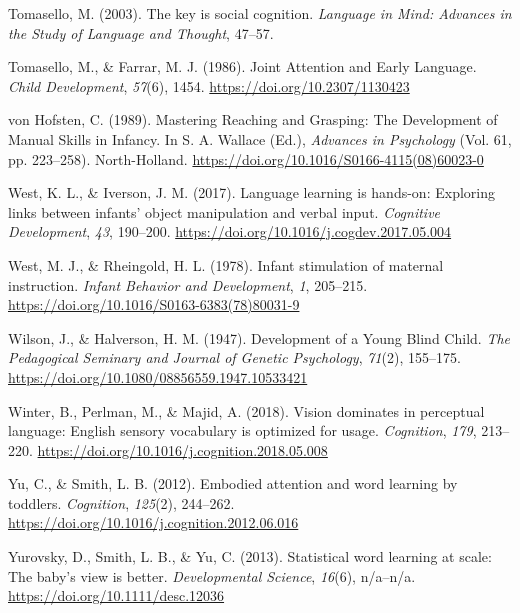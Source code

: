 \documentclass[english,man,floatsintext]{apa6}
\begin{document}
\leavevmode\hypertarget{ref-tomasello2003}{}%
Tomasello, M. (2003). The key is social cognition. \emph{Language in Mind: Advances in the Study of Language and Thought}, 47--57.

\leavevmode\hypertarget{ref-tomasello1986}{}%
Tomasello, M., \& Farrar, M. J. (1986). Joint Attention and Early Language. \emph{Child Development}, \emph{57}(6), 1454. \url{https://doi.org/10.2307/1130423}

\leavevmode\hypertarget{ref-vonhofsten1989}{}%
von Hofsten, C. (1989). Mastering Reaching and Grasping: The Development of Manual Skills in Infancy. In S. A. Wallace (Ed.), \emph{Advances in Psychology} (Vol. 61, pp. 223--258). North-Holland. \url{https://doi.org/10.1016/S0166-4115(08)60023-0}

\leavevmode\hypertarget{ref-west2017}{}%
West, K. L., \& Iverson, J. M. (2017). Language learning is hands-on: Exploring links between infants' object manipulation and verbal input. \emph{Cognitive Development}, \emph{43}, 190--200. \url{https://doi.org/10.1016/j.cogdev.2017.05.004}

\leavevmode\hypertarget{ref-west1978}{}%
West, M. J., \& Rheingold, H. L. (1978). Infant stimulation of maternal instruction. \emph{Infant Behavior and Development}, \emph{1}, 205--215. \url{https://doi.org/10.1016/S0163-6383(78)80031-9}

\leavevmode\hypertarget{ref-wilson1947}{}%
Wilson, J., \& Halverson, H. M. (1947). Development of a Young Blind Child. \emph{The Pedagogical Seminary and Journal of Genetic Psychology}, \emph{71}(2), 155--175. \url{https://doi.org/10.1080/08856559.1947.10533421}

\leavevmode\hypertarget{ref-winter2018}{}%
Winter, B., Perlman, M., \& Majid, A. (2018). Vision dominates in perceptual language: English sensory vocabulary is optimized for usage. \emph{Cognition}, \emph{179}, 213--220. \url{https://doi.org/10.1016/j.cognition.2018.05.008}

\leavevmode\hypertarget{ref-yu2012}{}%
Yu, C., \& Smith, L. B. (2012). Embodied attention and word learning by toddlers. \emph{Cognition}, \emph{125}(2), 244--262. \url{https://doi.org/10.1016/j.cognition.2012.06.016}

\leavevmode\hypertarget{ref-yurovsky2013}{}%
Yurovsky, D., Smith, L. B., \& Yu, C. (2013). Statistical word learning at scale: The baby's view is better. \emph{Developmental Science}, \emph{16}(6), n/a--n/a. \url{https://doi.org/10.1111/desc.12036}
\end{document}
